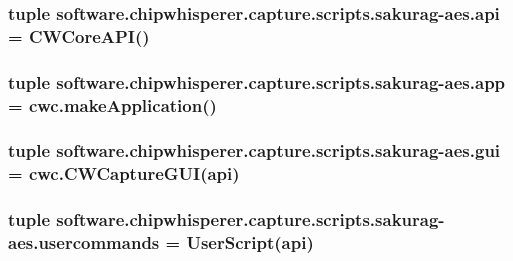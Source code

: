 \subsubsection[{api}]{\setlength{\rightskip}{0pt plus 5cm}tuple software.\+chipwhisperer.\+capture.\+scripts.\+sakurag-\/aes.\+api = C\+W\+Core\+A\+P\+I()}\label{namespacesoftware_1_1chipwhisperer_1_1capture_1_1scripts_1_1sakurag-aes_a0a6143af4cb02c4fc4effc737f95578b}
\hypertarget{namespacesoftware_1_1chipwhisperer_1_1capture_1_1scripts_1_1sakurag-aes_a5c11107ac86d47d4fe6628b9e67acaad}{}
\subsubsection[{app}]{\setlength{\rightskip}{0pt plus 5cm}tuple software.\+chipwhisperer.\+capture.\+scripts.\+sakurag-\/aes.\+app = cwc.\+make\+Application()}\label{namespacesoftware_1_1chipwhisperer_1_1capture_1_1scripts_1_1sakurag-aes_a5c11107ac86d47d4fe6628b9e67acaad}
\hypertarget{namespacesoftware_1_1chipwhisperer_1_1capture_1_1scripts_1_1sakurag-aes_a8034c90052e4725e000257765d5ff701}{}
\subsubsection[{gui}]{\setlength{\rightskip}{0pt plus 5cm}tuple software.\+chipwhisperer.\+capture.\+scripts.\+sakurag-\/aes.\+gui = cwc.\+C\+W\+Capture\+G\+U\+I({\bf api})}\label{namespacesoftware_1_1chipwhisperer_1_1capture_1_1scripts_1_1sakurag-aes_a8034c90052e4725e000257765d5ff701}
\hypertarget{namespacesoftware_1_1chipwhisperer_1_1capture_1_1scripts_1_1sakurag-aes_a92558e549001a1a6bc740a54bc8d27d0}{}
\subsubsection[{usercommands}]{\setlength{\rightskip}{0pt plus 5cm}tuple software.\+chipwhisperer.\+capture.\+scripts.\+sakurag-\/aes.\+usercommands = {\bf User\+Script}({\bf api})}\label{namespacesoftware_1_1chipwhisperer_1_1capture_1_1scripts_1_1sakurag-aes_a92558e549001a1a6bc740a54bc8d27d0}
